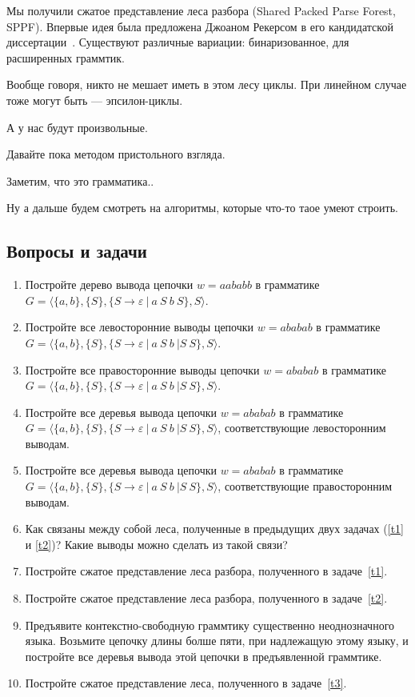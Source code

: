 Мы получили сжатое представление леса разбора (Shared Packed Parse Forest, SPPF). 
Впервые идея была предложена Джоаном Рекерсом в его кандидатской диссертации~\cite{SPPF}.
Существуют различные вариации: бинаризованное, для расширенных граммтик.

Вообще говоря, никто не мешает иметь в этом лесу циклы. 
При линейном случае тоже могут быть --- эпсилон-циклы.

А у нас будут произвольные.

Давайте пока методом пристольного взгляда.


Заметим, что это грамматика..


Ну а дальше будем смотреть на алгоритмы, которые что-то таое умеют строить.



\subsection{Вопросы и задачи}
\begin{enumerate}
  \item Постройте дерево вывода цепочки $w=aababb$ в грамматике $G=\langle\{a,b\},\{S\},\{S\rightarrow \varepsilon \ | \ a \ S \ b \ S \}, S \rangle$.
  \item Постройте все левосторонние выводы цепочки $w=ababab$ в грамматике $G=\langle\{a,b\},\{S\},\{S\rightarrow \varepsilon \ | \ a \ S \ b \ | S \ S\}, S \rangle$.
  \item Постройте все правосторонние выводы цепочки $w=ababab$ в грамматике $G=\langle\{a,b\},\{S\},\{S\rightarrow \varepsilon \ | \ a \ S \ b \ | S \ S\}, S \rangle$.
  \item \label{t1}Постройте все деревья вывода цепочки $w=ababab$ в грамматике $G=\langle\{a,b\},\{S\},\{S\rightarrow \varepsilon \ | \ a \ S \ b \ | S \ S\}, S \rangle$, соответствующие левосторонним выводам.
  \item \label{t2}Постройте все деревья вывода цепочки $w=ababab$ в грамматике $G=\langle\{a,b\},\{S\},\{S\rightarrow \varepsilon \ | \ a \ S \ b \ | S \ S\}, S \rangle$, соответствующие правосторонним выводам.
  \item Как связаны между собой леса, полученные в предыдущих двух задачах (\ref{t1} и \ref{t2})? Какие выводы можно сделать из такой связи?
  \item Постройте сжатое представление леса разбора, полученного в задаче~\ref{t1}.
  \item Постройте сжатое представление леса разбора, полученного в задаче~\ref{t2}.
  \item \label{t3}Предъявите контекстно-свободную граммтику существенно неоднозначного языка. 
        Возьмите цепочку длины болше пяти, при надлежащую этому языку, и постройте все деревья вывода этой цепочки в предъявленной граммтике. 
  \item Постройте сжатое представление леса, полученного в задаче~\ref{t3}.
\end{enumerate}
